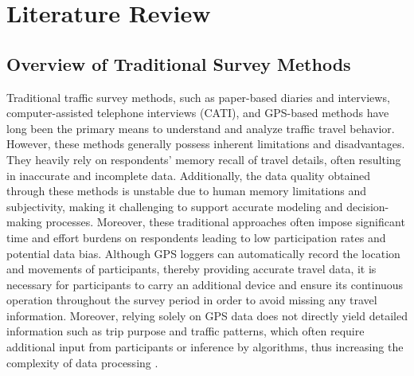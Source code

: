 \documentclass[12pt,two side]{report}
\begin{document}
\chapter{Literature Review}
\section{Overview of Traditional Survey Methods}
Traditional traffic survey methods, such as paper-based diaries and interviews, computer-assisted telephone interviews (CATI), and GPS-based methods have long been the primary means to understand and analyze traffic travel behavior\cite{alho2022online}\cite{cottrill2013future}\cite{hong2021insights}. However, these methods generally possess inherent limitations and disadvantages. They heavily rely on respondents' memory recall of travel details, often resulting in inaccurate and incomplete data\cite{hong2021insights}. Additionally, the data quality obtained through these methods is unstable due to human memory limitations and subjectivity, making it challenging to support accurate modeling and decision-making processes\cite{cottrill2013future}. Moreover, these traditional approaches often impose significant time and effort burdens on respondents leading to low participation rates and potential data bias\cite{cottrill2013future}. Although GPS loggers can automatically record the location and movements of participants, thereby providing accurate travel data, it is necessary for participants to carry an additional device and ensure its continuous operation throughout the survey period in order to avoid missing any travel information\cite{cottrill2013future}. Moreover, relying solely on GPS data does not directly yield detailed information such as trip purpose and traffic patterns, which often require additional input from participants or inference by algorithms, thus increasing the complexity of data processing \cite{hong2021insights}.
\end{document}
